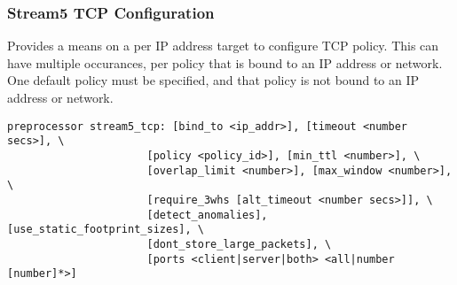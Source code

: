 \documentclass[english]{report}
\begin{document}
\subsubsection{Stream5 TCP Configuration}

Provides a means on a per IP address target to configure TCP policy.
This can have multiple occurances, per policy that is bound to an IP
address or network.  One default policy must be specified, and that policy
is not bound to an IP address or network.

\begin{verbatim}
preprocessor stream5_tcp: [bind_to <ip_addr>], [timeout <number secs>], \
                      [policy <policy_id>], [min_ttl <number>], \
                      [overlap_limit <number>], [max_window <number>], \
                      [require_3whs [alt_timeout <number secs>]], \
                      [detect_anomalies], [use_static_footprint_sizes], \
                      [dont_store_large_packets], \
                      [ports <client|server|both> <all|number [number]*>]
\end{verbatim}
\end{document}
